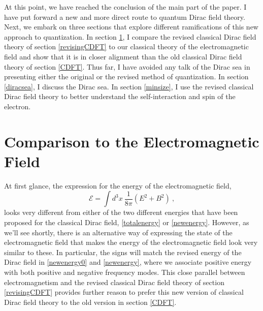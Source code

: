 \documentclass[12pt,secnumarabic,amsmath,amssymb,balancelastpage,nofootinbib]{article}
\begin{document}
At this point, we have reached the conclusion of the main part of the paper.  I have put forward a new and more direct route to quantum Dirac field theory.  Next, we embark on three sections that explore different ramifications of this new approach to quantization.  In section \ref{comparisontoEM}, I compare the revised classical Dirac field theory of section \ref{revisingCDFT} to our classical theory of the electromagnetic field and show that it is in closer alignment than the old classical Dirac field theory of section \ref{CDFT}.  Thus far, I have avoided any talk of the Dirac sea in presenting either the original or the revised method of quantization.  In section \ref{diracsea}, I discuss the Dirac sea.  In section \ref{minsize}, I use the revised classical Dirac field theory to better understand the self-interaction and spin of the electron.









\section{Comparison to the Electromagnetic Field}\label{comparisontoEM}

At first glance, the expression for the energy of the electromagnetic field,
\begin{equation}
\mathcal{E}=\int{d^3 x \ \frac{1}{8\pi}(E^2 + B^2)}
\ ,
\label{EMfieldenergy}
\end{equation}
looks very different from either of the two different energies that have been proposed for the classical Dirac field, \eqref{totalenergy} or \eqref{newenergy}.  However, as we'll see shortly, there is an alternative way of expressing the state of the electromagnetic field that makes the energy of the electromagnetic field look very similar to these.  In particular, the signs will match the revised energy of the Dirac field in \eqref{newenergy0} and \eqref{newenergy}, where we associate positive energy with both positive and negative frequency modes.  This close parallel between electromagnetism and the revised classical Dirac field theory of section \ref{revisingCDFT} provides further reason to prefer this new version of classical Dirac field theory to the old version in section \ref{CDFT}.
\end{document}
